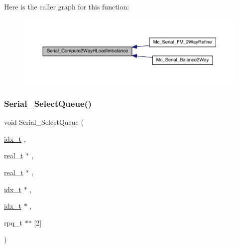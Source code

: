 Here is the caller graph for this function\+:\nopagebreak
\begin{figure}[H]
\begin{center}
\leavevmode
\includegraphics[width=350pt]{a00951_a9d86e1452d22862f6c41fd07390cea54_icgraph}
\end{center}
\end{figure}
\mbox{\label{a00951_a181213dcf1cf06a0cc6bf45b89ab881a}} 
\subsubsection{\texorpdfstring{Serial\+\_\+\+Select\+Queue()}{Serial\_SelectQueue()}}
{\footnotesize\ttfamily void Serial\+\_\+\+Select\+Queue (\begin{DoxyParamCaption}\item[{\hyperlink{a00876_aaa5262be3e700770163401acb0150f52}{idx\+\_\+t}}]{,  }\item[{\hyperlink{a00876_a1924a4f6907cc3833213aba1f07fcbe9}{real\+\_\+t} $\ast$}]{,  }\item[{\hyperlink{a00876_a1924a4f6907cc3833213aba1f07fcbe9}{real\+\_\+t} $\ast$}]{,  }\item[{\hyperlink{a00876_aaa5262be3e700770163401acb0150f52}{idx\+\_\+t} $\ast$}]{,  }\item[{\hyperlink{a00876_aaa5262be3e700770163401acb0150f52}{idx\+\_\+t} $\ast$}]{,  }\item[{rpq\+\_\+t $\ast$$\ast$}]{\mbox{[}2\mbox{]} }\end{DoxyParamCaption})}


